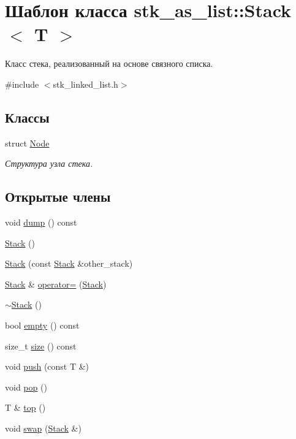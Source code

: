 \hypertarget{classstk__as__list_1_1_stack}{}\section{Шаблон класса stk\+\_\+as\+\_\+list\+:\+:Stack$<$ T $>$}
\label{classstk__as__list_1_1_stack}


Класс стека, реализованный на основе связного списка.  




{\ttfamily \#include $<$stk\+\_\+linked\+\_\+list.\+h$>$}

\subsection*{Классы}
\begin{DoxyCompactItemize}
\item 
struct \hyperlink{structstk__as__list_1_1_stack_1_1_node}{Node}
\begin{DoxyCompactList}\small\item\em Структура узла стека. \end{DoxyCompactList}\end{DoxyCompactItemize}
\subsection*{Открытые члены}
\begin{DoxyCompactItemize}
\item 
void \hyperlink{classstk__as__list_1_1_stack_aa556423ef52feaa947b2683440f2860c}{dump} () const 
\item 
\hyperlink{classstk__as__list_1_1_stack_a14cd1cba325bead4ff0a91bc6eb0f6f5}{Stack} ()
\item 
\hyperlink{classstk__as__list_1_1_stack_a31fcf797905470a84ec47fcd719b69a7}{Stack} (const \hyperlink{classstk__as__list_1_1_stack}{Stack} \&other\+\_\+stack)
\item 
\hyperlink{classstk__as__list_1_1_stack}{Stack} \& \hyperlink{classstk__as__list_1_1_stack_ae4e6aa8be8e4c25b878e4f3e1674c16a}{operator=} (\hyperlink{classstk__as__list_1_1_stack}{Stack})
\item 
\hyperlink{classstk__as__list_1_1_stack_a40bd5dff912f0e5290777c4b46d17809}{$\sim$\+Stack} ()
\item 
bool \hyperlink{classstk__as__list_1_1_stack_a2bd88c7b8faf901f4830ed616bf6478f}{empty} () const 
\item 
size\+\_\+t \hyperlink{classstk__as__list_1_1_stack_a3f3772679c16de93eae9eb92e2b85955}{size} () const 
\item 
void \hyperlink{classstk__as__list_1_1_stack_ad31b678390ac3f2076e9b757c95600be}{push} (const T \&)
\item 
void \hyperlink{classstk__as__list_1_1_stack_a09e820f3c3531cf3f401af3b3ca5d56f}{pop} ()
\item 
T \& \hyperlink{classstk__as__list_1_1_stack_a20e64b09239efa6340b33546115424b6}{top} ()
\item 
void \hyperlink{classstk__as__list_1_1_stack_a873d054824f9029f80df0fe8101eeda3}{swap} (\hyperlink{classstk__as__list_1_1_stack}{Stack} \&)
\end{DoxyCompactItemize}
